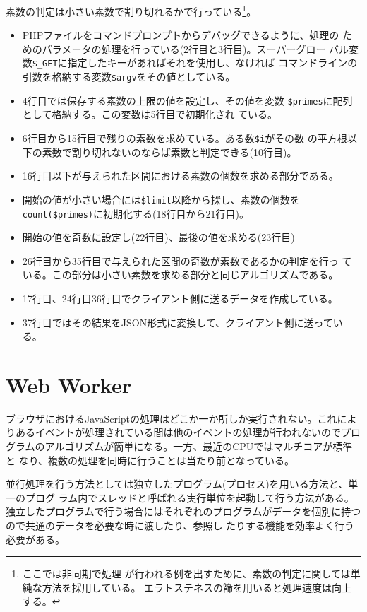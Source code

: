 \begin{Exec}
 素数の判定は小さい素数で割り切れるかで行っている\footnote{ここでは非同期で処理
 が行われる例を出すために、素数の判定に関しては単純な方法を採用している。
 エラトステネスの篩を用いると処理速度は向上する。}。
 \begin{itemize}
  \item PHPファイルをコマンドプロンプトからデバッグできるように、処理の
        ためのパラメータの処理を行っている(2行目と3行目)。スーパーグロー
        バル変数\Verb+$_GET+に指定したキーがあればそれを使用し、なければ
        コマンドラインの引数を格納する変数\Verb+$argv+をその値としている。
  \item 4行目では保存する素数の上限の値を設定し、その値を変数
        \Verb+$primes+に配列として格納する。この変数は5行目で初期化され
        ている。
  \item 6行目から15行目で残りの素数を求めている。ある数\Verb+$i+がその数
        の平方根以下の素数で割り切れないのならば素数と判定できる(10行目)。
  \item 16行目以下が与えられた区間における素数の個数を求める部分である。
  \item 開始の値が小さい場合には\Verb+$limit+以降から探し、素数の個数を
        \Verb+count($primes)+に初期化する(18行目から21行目)。
  \item 開始の値を奇数に設定し(22行目)、最後の値を求める(23行目)
  \item 26行目から35行目で与えられた区間の奇数が素数であるかの判定を行っ
        ている。この部分は小さい素数を求める部分と同じアルゴリズムである。
  \item 17行目、24行目36行目でクライアント側に送るデータを作成している。
  \item 37行目ではその結果をJSON形式に変換して、クライアント側に送ってい
        る。
 \end{itemize}
\end{Exec}
\section{Web Worker}
ブラウザにおけるJavaScriptの処理はどこか一か所しか実行されない。これによ
りあるイベントが処理されている間は他のイベントの処理が行われないのでプロ
グラムのアルゴリズムが簡単になる。一方、最近のCPUではマルチコアが標準と
なり、複数の処理を同時に行うことは当たり前となっている。

並行処理を行う方法としては独立したプログラム(プロセス)を用いる方法と、単一のプログ
ラム内でスレッドと呼ばれる実行単位を起動して行う方法がある。
独立したプログラムで行う場合にはそれぞれのプログラムがデータを個別に持つ
ので共通のデータを必要な時に渡したり、参照し
たりする機能を効率よく行う必要がある。

